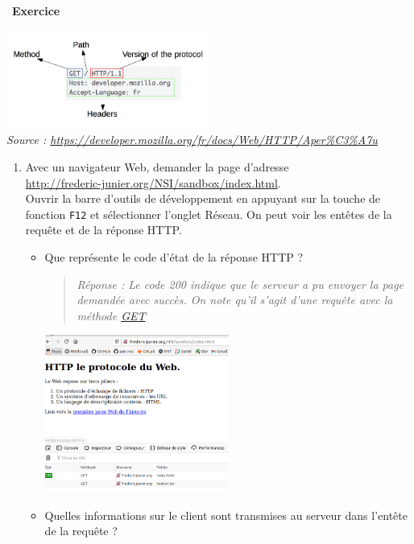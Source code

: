 \documentclass[
  11pt,
]{article}
\newcommand{\passthrough}[1]{#1}
\newcounter{exo}
\newenvironment{exercice}[1]
{\par \medskip   \addtocounter{exo}{1} \noindent  
\begin{bclogo}[arrondi =0.1,   noborder = true, logo=\bccrayon, marge=4]{~\textbf{Exercice} \textbf{\theexo} {\itshape #1} }  \par}
{
\end{bclogo}
 \par \bigskip }
\newcounter{def}
\begin{document}
\begin{exercice}{}

\includegraphics[width=0.5\textwidth,height=\textheight]{images/HTTP_Request.png}\\
\emph{Source :
\url{https://developer.mozilla.org/fr/docs/Web/HTTP/Aper\%C3\%A7u}}

\begin{enumerate}
\def\labelenumi{\arabic{enumi}.}
\item
  Avec un navigateur Web, demander la page d'adresse\\
  \url{http://frederic-junier.org/NSI/sandbox/index.html}.\\
  Ouvrir la barre d'outils de développement en appuyant sur la touche de
  fonction \passthrough{\lstinline!F12!} et sélectionner l'onglet
  Réseau. On peut voir les entêtes de la requête et de la réponse HTTP.

  \begin{itemize}
  \item
    Que représente le code d'état de la réponse HTTP ?

    \begin{quote}
    \emph{Réponse : Le code 200 indique que le serveur a pu envoyer la
    page demandée avec succès. On note qu'il s'agit d'une requête avec
    la méthode \url{GET}}
    \end{quote}

    \includegraphics[width=0.5\textwidth,height=\textheight]{images/exo2_code_reponse_http.png}\\
  \item
    Quelles informations sur le client sont transmises au serveur dans
    l'entête de la requête ?


\end{itemize}
\end{enumerate}
\end{exercice}
\end{document}
